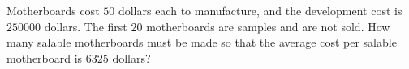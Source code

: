Motherboards cost $50$ dollars each to manufacture, and the development cost is $250000$ dollars. The first $20$ motherboards are samples and are not sold. How many salable motherboards must be made so that the average cost per salable motherboard is $6325$ dollars?
